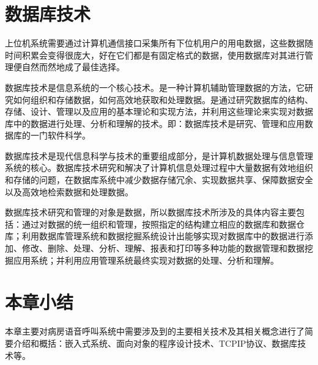 
\section{数据库技术}	
上{\cf}位机{\cf}系统{\cf}需要{\cf}通过{\cf}计算{\cf}机通{\cf}信接{\cf}口采{\cf}集所{\cf}有下{\cf}位机{\cf}用户{\cf}的用{\cf}电数{\cf}据，{\cf}这些{\cf}数据{\cf}随时{\cf}间积{\cf}累会{\cf}变得{\cf}很庞{\cf}大，{\cf}好在{\cf}它们{\cf}都是{\cf}有固{\cf}定格{\cf}式的{\cf}数据{\cf}，使{\cf}用数{\cf}据库{\cf}对其{\cf}进行{\cf}管理{\cf}便自{\cf}然而{\cf}然地{\cf}成了{\cf}最佳{\cf}选择。

数{\cf}据库{\cf}技术{\cf}是信{\cf}息系{\cf}统的{\cf}一个{\cf}核心{\cf}技术{\cf}。是{\cf}一种{\cf}计算{\cf}机辅{\cf}助管{\cf}理数{\cf}据的{\cf}方法{\cf}，它{\cf}研究{\cf}如何{\cf}组织{\cf}和存{\cf}储数{\cf}据，{\cf}如何{\cf}高效{\cf}地获{\cf}取和{\cf}处理{\cf}数据{\cf}。是{\cf}通过{\cf}研究{\cf}数据{\cf}库的{\cf}结构{\cf}、存{\cf}储、{\cf}设计{\cf}、管{\cf}理以{\cf}及应{\cf}用的{\cf}基本{\cf}理论{\cf}和实{\cf}现方{\cf}法，{\cf}并利{\cf}用这{\cf}些理{\cf}论来{\cf}实现{\cf}对数{\cf}据库{\cf}中的{\cf}数据{\cf}进行{\cf}处理{\cf}、分{\cf}析和{\cf}理解{\cf}的技{\cf}术。{\cf}即：{\cf}数据{\cf}库技{\cf}术是{\cf}研究{\cf}、管{\cf}理和{\cf}应用{\cf}数据{\cf}库的{\cf}一门{\cf}软件{\cf}科学。

数{\cf}据库{\cf}技术{\cf}是现{\cf}代信{\cf}息科{\cf}学与{\cf}技术{\cf}的重{\cf}要组{\cf}成部{\cf}分，{\cf}是计{\cf}算机{\cf}数据{\cf}处理{\cf}与信{\cf}息管{\cf}理系{\cf}统的{\cf}核心{\cf}。数{\cf}据库{\cf}技术{\cf}研究{\cf}和解{\cf}决了{\cf}计算{\cf}机信{\cf}息处{\cf}理过{\cf}程中{\cf}大量{\cf}数据{\cf}有效{\cf}地组{\cf}织和{\cf}存储{\cf}的问{\cf}题，{\cf}在数{\cf}据库{\cf}系统{\cf}中减{\cf}少数{\cf}据存{\cf}储冗{\cf}余、{\cf}实现{\cf}数据{\cf}共享{\cf}、保{\cf}障数{\cf}据安{\cf}全以{\cf}及高{\cf}效地{\cf}检索{\cf}数据{\cf}和处{\cf}理数据。

数{\cf}据库{\cf}技术{\cf}研究{\cf}和管{\cf}理的{\cf}对象{\cf}是数{\cf}据，{\cf}所以{\cf}数据{\cf}库技{\cf}术所{\cf}涉及{\cf}的具{\cf}体内{\cf}容主{\cf}要包{\cf}括：{\cf}通过{\cf}对数{\cf}据的{\cf}统一{\cf}组织{\cf}和管{\cf}理，{\cf}按照{\cf}指定{\cf}的结{\cf}构建{\cf}立相{\cf}应的{\cf}数据{\cf}库和{\cf}数据{\cf}仓库{\cf}；利{\cf}用数{\cf}据库{\cf}管理{\cf}系统{\cf}和数{\cf}据挖{\cf}掘系{\cf}统设{\cf}计出{\cf}能够{\cf}实现{\cf}对数{\cf}据库{\cf}中的{\cf}数据{\cf}进行{\cf}添加{\cf}、修{\cf}改、{\cf}删除{\cf}、处{\cf}理、{\cf}分析{\cf}、理{\cf}解、{\cf}报表{\cf}和打{\cf}印等{\cf}多种{\cf}功能{\cf}的数{\cf}据管{\cf}理和{\cf}数据{\cf}挖掘{\cf}应用{\cf}系统{\cf}；并{\cf}利用{\cf}应用{\cf}管理{\cf}系统{\cf}最终{\cf}实现{\cf}对数{\cf}据的{\cf}处理{\cf}、分{\cf}析和{\cf}理解。

\section{本章小结}
本章主要对病房语音呼叫系统中需要涉及到的主要相关技术及其相关概念进行了简要介绍和概括：嵌入式系统、面向对象的程序设计技术、\acrshort{TCPIP}协议、数据库技术等。
